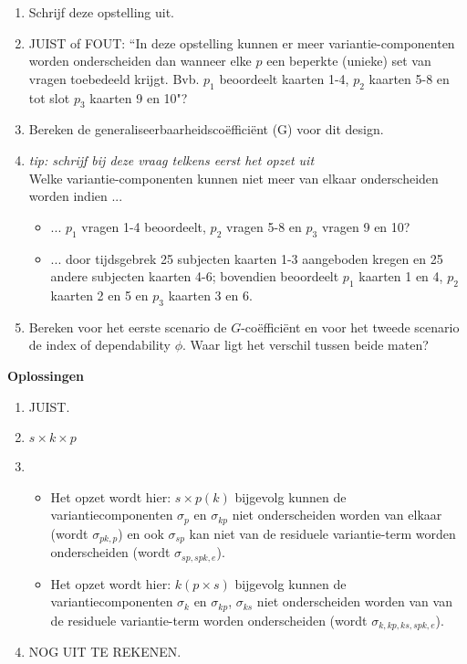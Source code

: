 {\begin{enumerate}
\begin{enumerate}
	\item Schrijf deze opstelling uit.
	\item JUIST of FOUT: ``In deze opstelling kunnen er meer variantie-componenten worden onderscheiden dan wanneer elke $p$ een beperkte (unieke) set van vragen toebedeeld krijgt. Bvb. $p_1$ beoordeelt kaarten 1-4, $p_2$ kaarten 5-8 en tot slot $p_3$ kaarten 9 en 10"?
	\item Bereken de generaliseerbaarheidsco\"{e}ffici\"{e}nt (G) voor dit design.
	\item \emph{tip: schrijf bij deze vraag telkens eerst het opzet uit}\\
	Welke variantie-componenten kunnen niet meer van elkaar onderscheiden worden indien ...
\begin{itemize}
	\item ... $p_1$ vragen 1-4 beoordeelt, $p_2$ vragen 5-8 en $p_3$ vragen 9 en 10?
	\item ... door tijdsgebrek 25 subjecten kaarten 1-3 aangeboden kregen en 25 andere subjecten kaarten 4-6; bovendien beoordeelt $p_1$ kaarten 1 en 4, $p_2$ kaarten 2 en 5 en $p_3$ kaarten 3 en 6.
\end{itemize}
\item Bereken voor het eerste scenario de $G$-co\"{e}ffici\"{e}nt en voor het tweede scenario de index of dependability $\phi$. Waar ligt het verschil tussen beide maten?
\end{enumerate}
\end{enumerate}
}

\OPLOSSING
{
\textbf{Oplossingen}
\begin{enumerate}
\item JUIST.
\item $s \times k \times p$
\item
\begin{itemize}
	\item Het opzet wordt hier: $s\times p\left(k\right)$ bijgevolg kunnen de variantiecomponenten $\sigma_p$ en $\sigma_{kp}$ niet onderscheiden worden van elkaar (wordt $\sigma_{pk,p}$) en ook $\sigma_{sp}$ kan niet van de residuele variantie-term worden onderscheiden (wordt $\sigma_{sp, spk,e}$).
	\item Het opzet wordt hier: $k\left(p\times s\right)$ bijgevolg kunnen de variantiecomponenten $\sigma_k$ en $\sigma_{kp}$, $\sigma_{ks}$ niet onderscheiden worden van  van de residuele variantie-term worden onderscheiden (wordt $\sigma_{k, kp, ks, spk, e}$).
\end{itemize}
\item NOG UIT TE REKENEN.
\end{enumerate}
}
